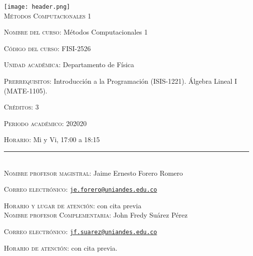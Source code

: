 \documentclass[letterpaper,10pt,onecolumn]{article}
\begin{document}
\begin{center}

\texttt{[image: header.png]}\\[0.5cm]

\textsc{\LARGE M\'etodos Computacionales 1}\\[0.1cm]

\end{center}

\large \noindent\textsc{Nombre del curso:}  M\'etodos Computacionales 1 %
  
\noindent\textsc{C\'odigo del curso:}  FISI-2526 %

\noindent\textsc{Unidad acad\'emica:} Departamento de F\'isica

\noindent\textsc{Prerrequisitos}: Introducci\'on a la Programaci\'on
(ISIS-1221). \'Algebra Lineal I (MATE-1105). 

\noindent\textsc{Cr\'editos}: 3

\noindent\textsc{Periodo acad\'emico:} 202020 %

\noindent\textsc{Horario:} Mi y Vi, 17:00 a 18:15

\noindent\rule{\textwidth}{1pt}\\[-0.3cm]

\normalsize \noindent\textsc{Nombre profesor magistral:}
Jaime Ernesto Forero Romero

\noindent\textsc{Correo electr\'onico:}
\href{mailto:je.forero@uniandes.edu.co}{\nolinkurl{je.forero@uniandes.edu.co}}

\noindent\textsc{Horario y lugar de atenci\'on:} 
con cita previa
\\[-0.1cm]




\normalsize \noindent\textsc{Nombre profesor Complementaria:}
John Fredy Su\'arez P\'erez

\noindent\textsc{Correo electr\'onico:}
\href{mailto:jf.suarez@uniandes.edu.co}{\nolinkurl{jf.suarez@uniandes.edu.co}}

\noindent\textsc{Horario de atenci\'on:} con cita previa. 
\\[-0.1cm]
\end{document}
